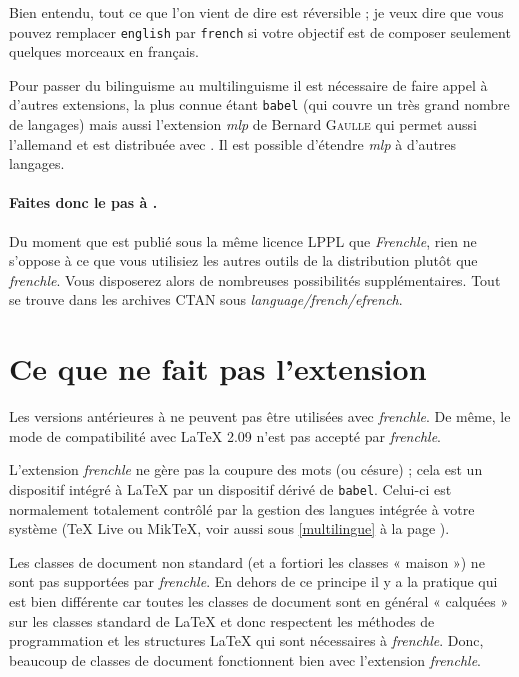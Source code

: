 \documentclass[a4paper,12pt,openright]{article}
\begin{document}
\noindent Bien entendu, tout ce que l’on vient de dire est réversible ; je veux dire que
vous pouvez remplacer \texttt{english} par \texttt{french} si votre objectif est de composer
seulement quelques morceaux en français.

Pour passer du bilinguisme 
au multilinguisme il est nécessaire de faire appel 
à d’autres extensions, la plus connue étant \texttt{babel} 
(qui couvre un très grand nombre 
de langages) mais aussi l’extension \textsl{mlp} de Bernard \textsc{Gaulle} qui permet aussi
l’allemand et est distribuée avec \textsl{\befr}. 
Il est possible d'étendre \textsl{mlp} à d'autres langages.

\paragraph*{ Faites donc le pas à \textsl{\befr}.}
Du moment que \textsl{\befr} est publié sous la même licence LPPL
que {\sl Frenchle}, rien ne s'oppose à ce que vous utilisiez 
les autres outils de la distribution
 \textsl{\befr} plutôt que {\it frenchle}.
Vous disposerez alors de nombreuses possibilités supplémentaires.
Tout se trouve dans les archives CTAN sous 
{\sl language/french/efrench}.

\section{Ce que ne fait pas l'extension}
Les versions antérieures à \LaTeXe ne peuvent pas être utilisées avec \textit{frenchle}.
De même, le mode de compatibilité avec \LaTeX{} 2.09 n’est pas accepté par
\textit{frenchle}.

L’extension \textit{frenchle} ne gère pas la coupure des mots (ou césure) ; cela est
un dispositif intégré à \LaTeX{} par un dispositif dérivé de \texttt{babel}.
Celui-ci est normalement totalement contrôlé par la gestion des langues intégrée
à votre système (\TeX{} Live ou Mik\TeX, voir aussi sous \ref{multilingue} à la page \pageref{multilingue}).

Les classes de document non standard (et a fortiori les classes « maison »)  %
ne sont pas supportées par \textit{frenchle}. En dehors de ce principe il y a la pratique
qui est bien différente car toutes les classes de document sont en général
« calquées » sur les classes standard de \LaTeX{} et donc respectent les méthodes
de programmation et les structures \LaTeX{} qui sont nécessaires à \textit{frenchle}. Donc,
beaucoup de classes de document fonctionnent bien avec l’extension \textit{frenchle}.
\end{document}
